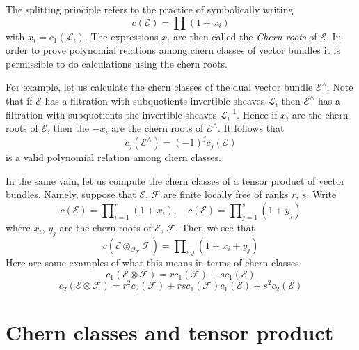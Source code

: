 \noindent
The splitting principle refers to the practice of
symbolically writing
$$
c({\mathcal E}) = \prod\nolimits (1+x_i)
$$
with $x_i = c_1(\mathcal{L}_i)$. The expressions $x_i$ are then
called the {\it Chern roots} of ${\mathcal E}$.
In order to prove polynomial relations among chern classes of
vector bundles it is permissible to do calculations using the
chern roots.

\medskip\noindent
For example, let us calculate the chern classes of the
dual vector bundle $\mathcal{E}^\wedge$. Note that
if $\mathcal{E}$ has a filtration with subquotients
invertible sheaves $\mathcal{L}_i$ then $\mathcal{E}^\wedge$
has a filtration with subquotients the invertible sheaves
$\mathcal{L}_i^{-1}$. Hence if $x_i$ are the chern roots of
$\mathcal{E}$, then the $-x_i$ are the chern roots of
$\mathcal{E}^\wedge$. It follows that
$$
c_j(\mathcal{E}^\wedge) = (-1)^j c_j(\mathcal{E})
$$
is a valid polynomial relation among chern classes.

\medskip\noindent
In the same vain, let us compute the chern classes of
a tensor product of vector bundles.
Namely, suppose that $\mathcal{E}$, $\mathcal{F}$
are finite locally free of ranks $r$, $s$.
Write
$$
c(\mathcal{E}) = \prod\nolimits_{i = 1}^r (1 + x_i),
\quad
c(\mathcal{E}) = \prod\nolimits_{j = 1}^s (1 + y_j)
$$
where $x_i$, $y_j$ are the chern roots of $\mathcal{E}$,
$\mathcal{F}$. Then we see that
$$
c(\mathcal{E} \otimes_{\mathcal{O}_X} \mathcal{F})
=
\prod\nolimits_{i, j} (1 + x_i + y_j)
$$
Here are some examples of what this means in terms of
chern classes
$$
c_1(\mathcal{E} \otimes \mathcal{F})
=
r c_1(\mathcal{F}) + s c_1(\mathcal{E})
$$
$$
c_2(\mathcal{E} \otimes \mathcal{F})
=
r^2 c_2(\mathcal{F}) +
rs c_1(\mathcal{F})c_1(\mathcal{E}) +
s^2 c_2(\mathcal{E})
$$



\section{Chern classes and tensor product}
\label{section-chern-classes-tensor}

